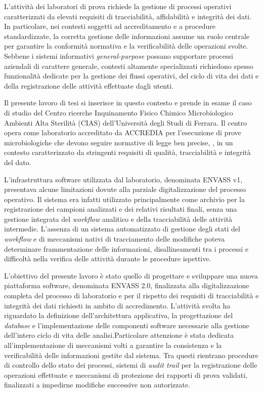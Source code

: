 L’attività dei laboratori di prova richiede la gestione di processi operativi caratterizzati da elevati requisiti di tracciabilità, affidabilità e integrità dei dati. In particolare, nei contesti soggetti ad accreditamento e a procedure standardizzate, la corretta gestione delle informazioni assume un ruolo centrale per garantire la conformità normativa e la verificabilità delle operazioni svolte. Sebbene i sistemi informativi \textit{general-purpose} possano supportare processi aziendali di carattere generale, contesti altamente specializzati richiedono spesso funzionalità dedicate per la gestione dei flussi operativi, del ciclo di vita dei dati e della registrazione delle attività effettuate dagli utenti.

Il presente lavoro di tesi si inserisce in questo contesto e prende in esame il caso di studio del Centro ricerche Inquinamento Fisico Chimico Microbiologico Ambienti Alta Sterilità (CIAS) dell’Università degli Studi di Ferrara. Il centro opera come laboratorio accreditato da ACCREDIA per l’esecuzione di prove microbiologiche che devono seguire normative di legge ben precise, , in un contesto caratterizzato da stringenti requisiti di qualità, tracciabilità e integrità del dato. 

L’infrastruttura software utilizzata dal laboratorio, denominata ENVASS v1, presentava alcune limitazioni dovute alla parziale digitalizzazione del processo operativo. Il sistema era infatti utilizzato principalmente come archivio per la registrazione dei campioni analizzati e dei relativi risultati finali, senza una gestione integrata del \textit{workflow} analitico e della tracciabilità delle attività intermedie. L’assenza di un sistema automatizzato di gestione degli stati del \textit{workflow} e di meccanismi nativi di tracciamento delle modifiche poteva determinare frammentazione delle informazioni, disallineamenti tra i processi e difficoltà nella verifica delle attività durante le procedure ispettive.

L’obiettivo del presente lavoro è stato quello di progettare e sviluppare una nuova piattaforma software, denominata ENVASS 2.0, finalizzata alla digitalizzazione completa del processo di laboratorio e per il rispetto dei requisiti di tracciabilità e integrità dei dati richiesti in ambito di accredimento. L’attività svolta ha riguardato la definizione dell’architettura applicativa, la progettazione del \textit{database} e l’implementazione delle componenti software necessarie alla gestione dell’intero ciclo di vita delle analisi.Particolare attenzione è stata dedicata all’implementazione di meccanismi volti a garantire la consistenza e la verificabilità delle informazioni gestite dal sistema. Tra questi rientrano procedure di controllo dello stato dei processi, sistemi di \textit{audit trail} per la registrazione delle operazioni effettuate e meccanismi di protezione dei rapporti di prova validati, finalizzati a impedirne modifiche successive non autorizzate.

